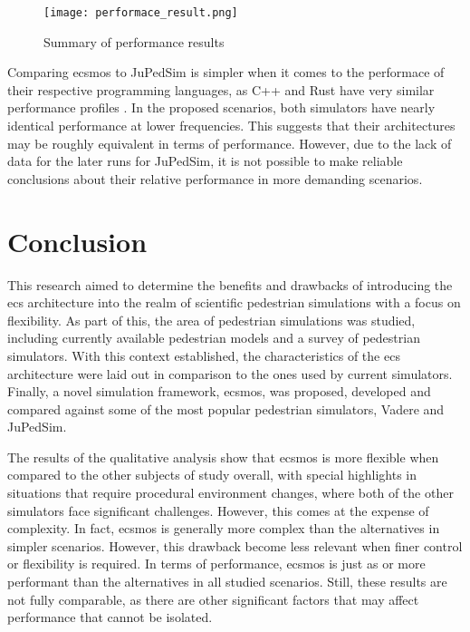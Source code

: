 \documentclass[twoside, 11pt]{article}
\begin{document}
\begin{figure}
  \centering
  \texttt{[image: performace\_result.png]}
  \caption[Summary of performance results]{Summary of performance results}
  \label{fig:performace-results}
\end{figure}

Comparing \gls{ecsmos} to JuPedSim is simpler when it comes to the performace of their respective programming languages, as C++ and Rust have very similar performance profiles \cite{electronics12010143}. In the proposed scenarios, both simulators have nearly identical performance at lower frequencies. This suggests that their architectures may be roughly equivalent in terms of performance. However, due to the lack of data for the later runs for JuPedSim, it is not possible to make reliable conclusions about their relative performance in more demanding scenarios.




\section{Conclusion} \label{sec:conclusion}

This research aimed to determine the benefits and drawbacks of introducing the \gls{ecs} architecture into the realm of scientific pedestrian simulations with a focus on flexibility. As part of this, the area of pedestrian simulations was studied, including currently available pedestrian models and a survey of pedestrian simulators. With this context established, the characteristics of the \gls{ecs} architecture were laid out in comparison to the ones used by current simulators. Finally, a novel simulation framework, \gls{ecsmos}, was proposed, developed and compared against some of the most popular pedestrian simulators, Vadere and JuPedSim.

The results of the qualitative analysis show that \gls{ecsmos} is more flexible when compared to the other subjects of study overall, with special highlights in situations that require procedural environment changes, where both of the other simulators face significant challenges. However, this comes at the expense of complexity. In fact, \gls{ecsmos} is generally more complex than the alternatives in simpler scenarios. However, this drawback become less relevant when finer control or flexibility is required. In terms of performance, \gls{ecsmos} is just as or more performant than the alternatives in all studied scenarios. Still, these results are not fully comparable, as there are other significant factors that may affect performance that cannot be isolated.
\end{document}
